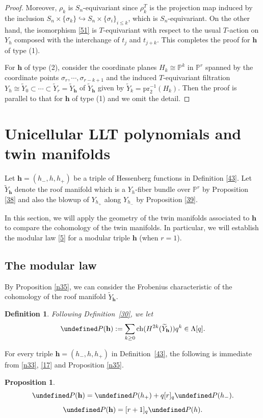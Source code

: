 \documentclass[11pt]{article}
\newtheorem{proposition}[theo]{Proposition}
\newtheorem{definition}[theo]{Definition}
\theoremstyle{definition}
\numberwithin{equation}{section}
\let\cal\undefined
\numberwithin{equation}{section}
\newcommand{\PP}{\mathbb{P}}
\newcommand{\cal}{\mathcal}
\newcommand\cP{{\cal P}}
\newcommand\tY{{\widetilde{Y}}}
\newcommand\ch{\mathrm{ch} }
\newcommand\beq{\begin{equation}}
\newcommand\eeq{\end{equation}}
\newcommand\pr{\mathrm{pr}}
\newcommand\bh{\mathbf{h}}
\begin{document}
\begin{proof}
	Moreover, $\rho_k$ is $S_n$-equivariant since $\rho_k^T$ is the projection map induced by the inclusion $S_n\times \{\sigma_k\} \hookrightarrow  S_n\times \{\sigma_i\}_{i\leq k}$, which is $S_n$-equivariant.	
	On the other hand, the isomorphism \eqref{51} is $T$-equivariant with respect to the usual $T$-action on $Y_h$ composed with the interchange of $t_j$ and $t_{j+k}$. 
	This completes the proof for $\bh$ of type (1).
	
	For $\bh$ of type (2), consider the coordinate planes $H_k\cong \PP^{k}$ in $\PP^r$ spanned by the coordinate points $\sigma_r,\cdots, \sigma_{r-k+1}$ and the induced $T$-equivariant filtration $Y_h\cong \tY_0 \subset \cdots \subset \tY_r=\tY_\bh$ 
	of $\tY_\bh$ given by $\tY_k=\pr_2^{-1}(H_k)$. Then the proof is parallel to that for $\bh$ of type (1) and we omit the detail.	
\end{proof}

\section{Unicellular LLT polynomials and twin manifolds}\label{S4}
		
Let $\bh=(h_-,h,h_+)$ be a triple of Hessenberg functions in Definition \ref{43}.
Let $\tY_\bh$ denote the roof manifold which is a $Y_h$-fiber bundle over $\PP^r$ by Proposition \ref{38} and also the blowup of $Y_{h_+}$ along $Y_{h_-}$ by Proposition \ref{39}. 
 
In this section, we will apply the geometry of the twin manifolds associated to $\bh$ to compare the cohomology of the twin manifolds. 
In particular, we will establish the modular law \eqref{5}
for a modular triple $\bh$ (when $r=1$). 

\subsection{The modular law}

By Proposition \ref{n35}, we can consider the Frobenius characteristic of the cohomology of the roof manifold $\tY_\bh$. 
\begin{definition}\label{28}
	Following Definition~\ref{30}, we let
	\[\cP(\bh):=\sum_{k\geq 0}\ch(H^{2k}(\tY_\bh))q^k \in \Lambda[q].\]
\end{definition}

For every triple $\bh=(h_-,h,h_+)$ in Definition~\ref{43}, the following is immediate from \eqref{n33}, \eqref{17} and Proposition \ref{n35}.
\begin{proposition}\label{27}
	\beq \label{31} \cP(\bh)=\cP(h_+)+q[r]_q\cP(h_-).\eeq
	\beq \label{32}\cP(\bh)=[r+1]_q\cP(h).\eeq
\end{proposition}
\end{document}
